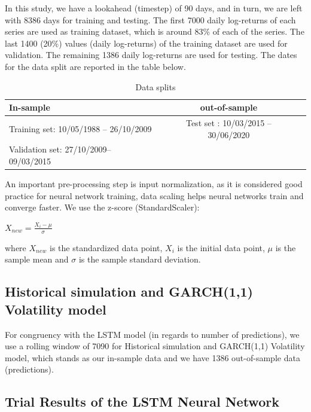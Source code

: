 \documentclass[a4paper,11pt,oneside]{book}
\begin{document}
In this study, we have a lookahead (timestep) of 90 days, and in turn, we are left with 8386 days for training and testing. The first 7000 daily log-returns of each series are used as training dataset, which is around 83\% of each of the series. The last 1400 (20\%) values (daily log-returns) of the training dataset are used for validation. The remaining 1386 daily log-returns are used for testing. The dates for the data split are reported in the table below.
\newline\newline
\begin{table}[!h]
	\centering
	\begin{tabular}{l|cl}
		\hline \hline
		In-sample
		& out-of-sample\\ \hline
		Training set: 10/05/1988 – 26/10/2009
		& Test set
		: 10/03/2015 – 30/06/2020
	 \\
		Validation set: 27/10/2009– 09/03/2015
		\\
		\hline \hline
	\end{tabular}
	\caption{Data splits}
	\label{firsttab}
\end{table}

An important pre-processing step is input normalization, as it is considered good practice for neural network training, data scaling helps neural networks train and converge faster. We use the z-score (StandardScaler): 

\begin{center}
	$X_{new} = \frac{X_{i}-\mu}{\sigma}$
\end{center}

where $X_{new}$ is the standardized data point, $X_{i}$ is the initial data point, $\mu$ is the sample mean and $\sigma$ is the sample standard deviation.


\subsection{Historical simulation and GARCH(1,1) Volatility model}
For congruency with the LSTM model (in regards to number of predictions), we use a rolling window of 7090 for Historical simulation and GARCH(1,1) Volatility model, which stands as our in-sample data and we have 1386 out-of-sample data (predictions).

\subsection{Trial Results of the LSTM Neural Network}
\end{document}

